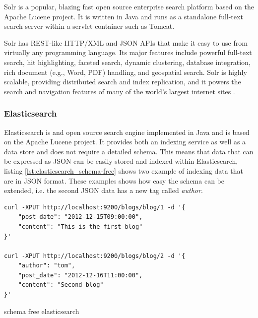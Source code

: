 Solr is a popular, blazing fast open source enterprise search platform based on the Apache Lucene project. It is written in Java and runs as a standalone full-text search server within a servlet container such as Tomcat. 

Solr has \ac{REST}-like \ac{HTTP}/\ac{XML} and \ac{JSON} \ac{API}s that make it easy to use from virtually any programming language. Its major features include powerful full-text search, hit highlighting, faceted search, dynamic clustering, database integration, rich document (e.g., Word, PDF) handling, and geospatial search. Solr is highly scalable, providing distributed search and index replication, and it powers the search and navigation features of many of the world's largest internet sites \cite{welcome_to_solr}.


\subsubsection{Elasticsearch \label{sec:back_se_es}}

Elasticsearch is and open source search engine implemented in Java and is based on the Apache Lucene project. It provides both an indexing service as well as a data store and does not require a detailed schema. This means that data that can be expressed as
\ac{JSON} can be easily stored and indexed within Elasticsearch, listing \ref{lst:elasticsearch_schema-free} shows two example of indexing data that are in \ac{JSON} format. These examples shows how easy the schema can be extended, i.e. the second \ac{JSON} data has a new tag called \textit{author}.
 
\begin{code}
\begin{verbatim}
curl -XPUT http://localhost:9200/blogs/blog/1 -d '{
    "post_date": "2012-12-15T09:00:00",
    "content": "This is the first blog"
}'

curl -XPUT http://localhost:9200/blogs/blog/2 -d '{
    "author": "tom",
    "post_date": "2012-12-16T11:00:00",
    "content": "Second blog"
}'
\end{verbatim}
\caption{schema free elasticsearch}
\label{lst:elasticsearch_schema-free}
\end{code}



